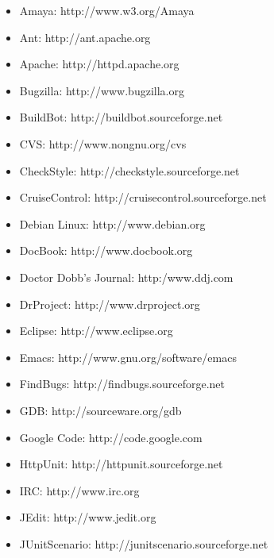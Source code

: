 \documentclass{report}
\begin{document}
\begin{itemize}

  \item Amaya: http://www.w3.org/Amaya

  \item Ant: http://ant.apache.org

  \item Apache: http://httpd.apache.org

  \item Bugzilla: http://www.bugzilla.org

  \item BuildBot: http://buildbot.sourceforge.net

  \item CVS: http://www.nongnu.org/cvs

  \item CheckStyle: http://checkstyle.sourceforge.net

  \item CruiseControl: http://cruisecontrol.sourceforge.net

  \item Debian Linux: http://www.debian.org

  \item DocBook: http://www.docbook.org

  \item Doctor Dobb's Journal: http:/www.ddj.com

  \item DrProject: http://www.drproject.org

  \item Eclipse: http://www.eclipse.org

  \item Emacs: http://www.gnu.org/software/emacs

  \item FindBugs: http://findbugs.sourceforge.net

  \item GDB: http://sourceware.org/gdb

  \item Google Code: http://code.google.com

  \item HttpUnit: http://httpunit.sourceforge.net

  \item IRC: http://www.irc.org

  \item JEdit: http://www.jedit.org

  \item JUnitScenario: http://junitscenario.sourceforge.net


\end{itemize}
\end{document}
